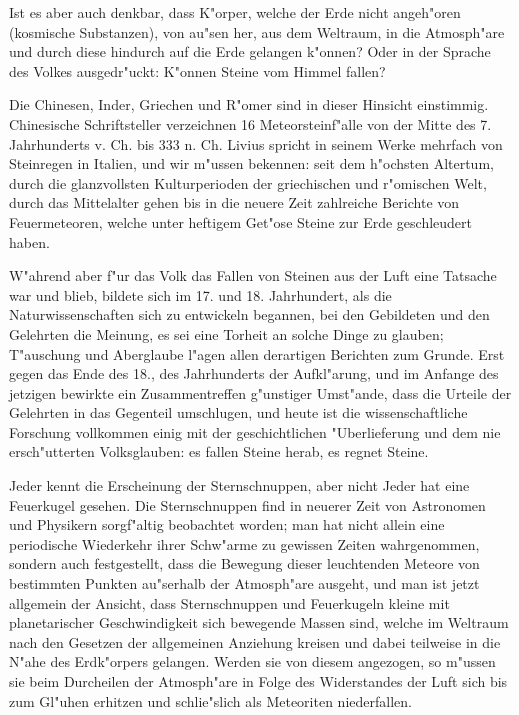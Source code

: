 \documentclass[a4paper, 11pt, oneside, german]{article}
\begin{document}
Ist es aber auch denkbar, dass K"orper, welche der Erde nicht angeh"oren (kosmische Substanzen), von au"sen her, aus dem Weltraum, in die Atmosph"are und durch diese hindurch auf die Erde gelangen k"onnen? Oder in der Sprache des Volkes ausgedr"uckt: K"onnen Steine vom Himmel fallen?

Die Chinesen, Inder, Griechen und R"omer sind in dieser Hinsicht einstimmig. Chinesische Schriftsteller verzeichnen 16 Meteorsteinf"alle von der Mitte des 7. Jahrhunderts v. Ch. bis 333 n. Ch. Livius spricht in seinem Werke mehrfach von Steinregen in Italien, und wir m"ussen bekennen: seit dem h"ochsten Altertum, durch die glanzvollsten Kulturperioden der griechischen und r"omischen Welt, durch das Mittelalter gehen bis in die neuere Zeit zahlreiche Berichte von Feuermeteoren, welche unter heftigem Get"ose Steine zur Erde geschleudert haben.

W"ahrend aber f"ur das Volk das Fallen von Steinen aus der Luft eine Tatsache war und blieb, bildete sich im 17. und 18. Jahrhundert, als die Naturwissenschaften sich zu entwickeln begannen, bei den Gebildeten und den Gelehrten die Meinung, es sei eine Torheit an solche Dinge zu glauben; T"auschung und Aberglaube l"agen allen derartigen Berichten zum Grunde. Erst gegen das Ende des 18., des Jahrhunderts der Aufkl"arung, und im Anfange des jetzigen bewirkte ein Zusammentreffen g"unstiger Umst"ande, dass die Urteile der Gelehrten in das Gegenteil umschlugen, und heute ist die wissenschaftliche Forschung vollkommen einig mit der geschichtlichen "Uberlieferung und dem nie ersch"utterten Volksglauben: es fallen Steine herab, es regnet Steine.

Jeder kennt die Erscheinung der Sternschnuppen, aber nicht Jeder hat eine Feuerkugel gesehen. Die Sternschnuppen find in neuerer Zeit von Astronomen und Physikern sorgf"altig beobachtet worden; man hat nicht allein eine periodische Wiederkehr ihrer Schw"arme zu gewissen Zeiten wahrgenommen, sondern auch festgestellt, dass die Bewegung dieser leuchtenden Meteore von bestimmten Punkten au"serhalb der Atmosph"are ausgeht, und man ist jetzt allgemein der Ansicht, dass Sternschnuppen und Feuerkugeln kleine mit planetarischer Geschwindigkeit sich bewegende Massen sind, welche im Weltraum nach den Gesetzen der allgemeinen Anziehung kreisen und dabei teilweise in die N"ahe des Erdk"orpers gelangen. Werden sie von diesem angezogen, so m"ussen sie beim Durcheilen der Atmosph"are in Folge des Widerstandes der Luft sich bis zum Gl"uhen erhitzen und schlie"slich als Meteoriten niederfallen.
\end{document}
